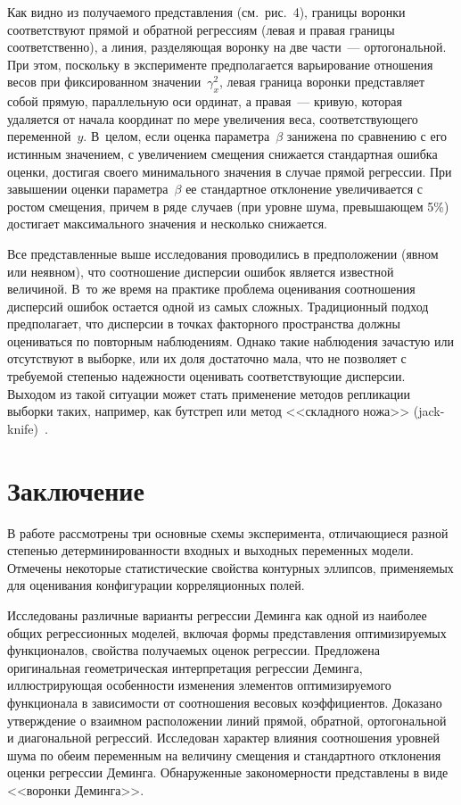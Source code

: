 \begin{multicols}{2}
  Как видно из получаемого представления (см.\ рис.~4), границы воронки
соответствуют прямой и обратной регрессиям (левая и правая границы
соответственно), а линия, разделяющая воронку на две части~---
ортогональной. При этом, поскольку в эксперименте предполагается
варьирование отношения весов при фиксированном
значении~$\gamma^2_x$, левая граница воронки представляет собой
прямую, параллельную оси ординат, а правая~--- кривую, которая удаляется
от начала координат по мере увеличения веса, соответствующего
переменной~$y$. В~целом, если оценка параметра~$\beta$ занижена по
сравнению с его истинным значением, с увеличением смещения снижается
стандартная ошибка оценки, достигая своего минимального значения в
случае прямой регрессии. При завышении оценки параметра~$\beta$ ее
стандартное отклонение увеличивается с ростом смещения, причем в ряде
случаев (при уровне шума, превышающем 5\%) достигает максимального
значения и несколько снижается.

  Все представленные выше исследования проводились в предположении
(явном или неявном), что соотношение дисперсии ошибок является известной
величиной. В~то же время на практике проблема оценивания соотношения
дисперсий ошибок остается одной из самых сложных. Традиционный подход
предполагает, что дисперсии в точках факторного пространства должны
оцениваться по повторным наблюдениям. Однако такие наблюдения
зачастую или отсутствуют в выборке, или их доля достаточно мала, что не
позволяет с требуемой степенью надежности оценивать соответствующие
дисперсии. Выходом из такой ситуации может стать применение методов
репликации выборки таких, например, как бутстреп или метод <<складного
ножа>>
  (jack-knife)~\cite{13-tim}.

\section{Заключение}

  В работе рассмотрены три основные схемы эксперимента, отличающиеся
разной степенью детерминированности входных и выходных переменных
модели. Отмечены некоторые статистические свойства контурных эллипсов,
применяемых для оценивания конфигурации корреляционных полей.

  Исследованы различные варианты регрессии Деминга как одной из
наиболее общих регрессионных моделей, включая формы представления
оптимизируемых функционалов, свойства получаемых оценок регрессии.
Предложена оригинальная геометрическая интерпретация регрессии
Деминга, иллюстрирующая особенности изменения элементов
оптимизируемого функционала в зависимости от соотношения весовых
коэффициентов. Доказано утверждение о взаимном расположении линий
прямой, обратной, ортогональной и диагональной регрессий. Исследован
характер влияния соотношения уровней шума по обеим переменным на
величину смещения и стандартного отклонения оценки регрессии Деминга.
Обнаруженные закономерности представлены в виде <<воронки Деминга>>.


\end{multicols}
